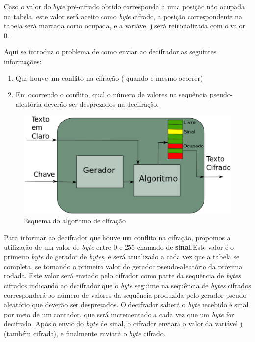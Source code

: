 Caso o valor do \textit{byte} pré-cifrado obtido corresponda a uma posição não ocupada na tabela, este valor será aceito como \textit{byte} cifrado, a posição correspondente na tabela será marcada como ocupada, e a variável j será reinicializada com o valor 0.

Aqui se introduz o problema de como enviar ao decifrador as seguintes informações:

\begin{enumerate}
	\item Que houve um conflito na cifração ( quando o mesmo ocorrer)
	\item Em ocorrendo o conflito, qual o número de valores na sequência pseudo-aleatória deverão ser desprezados na decifração.
\end{enumerate}


\begin{figure}[h]
	\centering
	\includegraphics[scale=0.4]{figuras/funcionamento.eps}
	\caption{Esquema do algoritmo de cifração}
\end{figure}

Para informar ao decifrador que houve um conflito na cifração, propomos a utilização de um valor de \textit{byte} entre 0 e 255 chamado de \textbf{sinal}.Este valor é o primeiro \textit{byte} do gerador de \textit{bytes}, e será atualizado a cada vez que a tabela se completa, se tornando o primeiro valor do gerador pseudo-aleatório da próxima rodada. Este valor será enviado pelo cifrador como parte da sequência de \textit{bytes} cifrados indicando ao decifrador que o \textit{byte} seguinte na sequência de \textit{bytes} cifrados corresponderá ao número de valores da sequência produzida pelo gerador pseudo-aleatório que deverão ser desprezados. O decifrador saberá o \textit{byte} recebido é sinal por meio de um contador, que será incrementado a cada vez que um \textit{byte} for decifrado. Após o envio do \textit{byte} de sinal, o cifrador  enviará o valor da variável j (também cifrado), e finalmente enviará o \textit{byte} cifrado.

